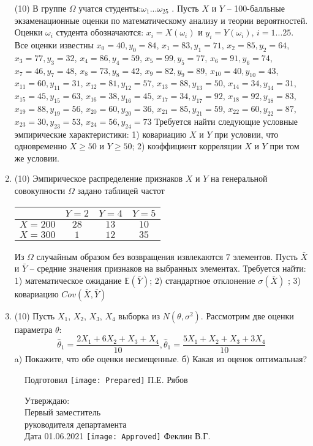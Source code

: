 \documentclass[a4paper,10pt]{article}
\begin{document}
\begin{enumerate}
(10) В группе $\Omega$ учатся студенты:$\omega _{1}...\omega _{25}$ . Пусть $X$ и $Y$ – 100-балльные экзаменационные оценки по
математическому анализу и теории вероятностей. Оценки $\omega _{i}$ студента обозначаются: $x _{i} = X(\omega _{i})$ и $y _{i} = Y(\omega _{i})$, $i = 1...25$. Все оценки известны
$x _{0} = 40, y _{0} = 84$, $x _{1} = 83, y _{1} = 71$, $x _{2} = 85, y _{2} = 64$, $x _{3} = 77, y _{3} = 32$, $x _{4} = 86, y _{4} = 59$, $x _{5} = 99, y _{5} = 77$, $x _{6} = 91, y _{6} = 74$, $x _{7} = 46, y _{7} = 48$, $x _{8} = 73, y _{8} = 42$, $x _{9} = 82, y _{9} = 89$, $x _{10} = 40, y _{10} = 43$, $x _{11} = 60, y _{11} = 31$, $x _{12} = 81, y _{12} = 57$, $x _{13} = 88, y _{13} = 50$, $x _{14} = 34, y _{14} = 31$, $x _{15} = 45, y _{15} = 63$, $x _{16} = 38, y _{16} = 45$, $x _{17} = 34, y _{17} = 92$, $x _{18} = 92, y _{18} = 83$, $x _{19} = 88, y _{19} = 56$, $x _{20} = 60, y _{20} = 36$, $x _{21} = 85, y _{21} = 59$, $x _{22} = 60, y _{22} = 87$, $x _{23} = 30, y _{23} = 53$, $x _{24} = 56, y _{24} = 73$
Требуется
найти следующие условные эмпирические характеристики: 1) ковариацию $X$ и $Y$ при условии, что одновременно $X \geqslant 50$
 и $Y \geqslant 50$; 2) коэффициент корреляции $X$ и $Y$ при том же условии.


\item


(10) Эмпирическое распределение признаков $X$ и $Y$ на генеральной совокупности $\Omega$ задано таблицей частот  
 
\begin{tabular}{ | c | c | c | c | }
\hline
 & $Y = 2$ & $Y = 4$ & $Y = 5$  \\ \hline
$X = 200$ & $28$ & $13$ & $10$\\ \hline
$X = 300$ & $1$ & $12$ & $35$\\
\hline
\end{tabular}

Из $\Omega$ случайным образом без возвращения извлекаются $7$ элементов. 
Пусть $\bar X$ и $\bar Y$ – средние значения признаков на выбранных элементах. 
Требуется найти: 1) математическое ожидание $\mathbb{E}(\bar Y)$; 2) стандартное отклонение $\sigma(\bar X)$ ; 
3) ковариацию $Cov(\bar X, \bar Y)$


\item


(10) Пусть $X _{1}$, $X _{2}$, $X _{3}$, $X _{4}$ выборка из $N(\theta, \sigma ^{2})$. Рассмотрим две оценки параметра $\theta$:
\[\hat \theta _{1} = \frac{2X _{1} + 6X _{2} + X _{3} + X _{4}}{10}, \hat \theta _{1} = \frac{5X _{1} + X _{2} + X _{3} + 3X _{4}}{10}\]
a) Покажите, что обе оценки несмещенные.
б) Какая из оценок оптимальная?


\end{enumerate}

\begin{figure}[H]
	Подготовил
	\hfill
	\texttt{[image: Prepared]}
	П.Е. Рябов
\end{figure}


\begin{figure}[H]
	Утверждаю:\\
	Первый заместитель\\
	руководителя департамента\\
	Дата 01.06.2021
	\hfill
	\texttt{[image: Approved]}
	Феклин В.Г.
\end{figure}
\end{document}
